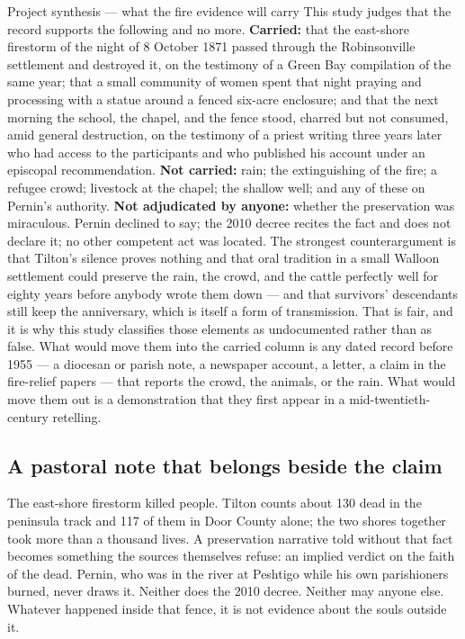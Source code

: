 \begin{judgmentbox}{Project synthesis --- what the fire evidence will
carry}
This study judges that the record supports the following and no more.
\textbf{Carried:} that the east-shore firestorm of the night of 8
October 1871 passed through the Robinsonville settlement and destroyed
it, on the testimony of a Green Bay compilation of the same year;
that a small community of women spent that night praying and
processing with a statue around a fenced six-acre enclosure; and that
the next morning the school, the chapel, and the fence stood, charred
but not consumed, amid general destruction, on the testimony of a
priest writing three years later who had access to the participants and
who published his account under an episcopal recommendation.
\textbf{Not carried:} rain; the extinguishing of the fire; a refugee
crowd; livestock at the chapel; the shallow well; and any of these on
Pernin's authority. \textbf{Not adjudicated by anyone:} whether the
preservation was miraculous. Pernin declined to say; the 2010 decree
recites the fact and does not declare it; no other competent act was
located.\jsep
The strongest counterargument is that Tilton's silence proves nothing
and that oral tradition in a small Walloon settlement could preserve
the rain, the crowd, and the cattle perfectly well for eighty years
before anybody wrote them down --- and that survivors' descendants
still keep the anniversary, which is itself a form of transmission.
That is fair, and it is why this study classifies those elements as
undocumented rather than as false. What would move them into the
carried column is any dated record before 1955 --- a diocesan or parish
note, a newspaper account, a letter, a claim in the fire-relief papers
--- that reports the crowd, the animals, or the rain. What would move
them out is a demonstration that they first appear in a
mid-twentieth-century retelling.
\end{judgmentbox}

\subsection{A pastoral note that belongs beside the claim}

The east-shore firestorm killed people. Tilton counts about 130 dead in
the peninsula track and 117 of them in Door County alone; the two
shores together took more than a thousand lives. A preservation
narrative told without that fact becomes something the sources
themselves refuse: an implied verdict on the faith of the dead. Pernin,
who was in the river at Peshtigo while his own parishioners burned,
never draws it. Neither does the 2010 decree. Neither may anyone else.
Whatever happened inside that fence, it is not evidence about the souls
outside it.
